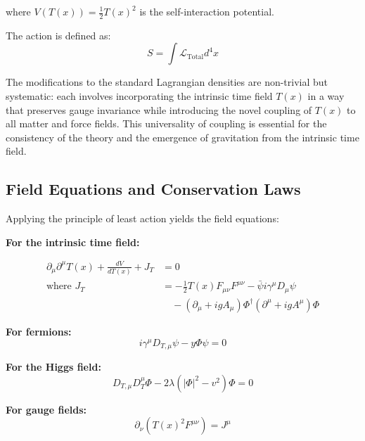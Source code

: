 \documentclass[12pt,a4paper]{article} %
\newcommand{\Tfield}{T(x)}
\newcommand{\DTmu}{D_{T,\mu}}
\newcommand{\calL}{\mathcal{L}}
\begin{document}
	where $V(\Tfield) = \frac{1}{2}\Tfield^2$ is the self-interaction potential.
	
	The action is defined as:
	\begin{equation}
		S = \int\calL_{\text{Total}}d^4x
		\label{eq:action}
	\end{equation}
	
	The modifications to the standard Lagrangian densities are non-trivial but systematic:
	each involves incorporating the intrinsic time field $\Tfield$
	in a way that preserves gauge invariance
	while introducing the novel coupling of $\Tfield$ to all matter and force fields. 
	This universality of coupling is essential for the consistency of the theory
	and the emergence of gravitation from the intrinsic time field.
	
	\subsection{Field Equations and Conservation Laws}
	\label{subsec:field_eqs}
	
	Applying the principle of least action yields the field equations:
	
	\textbf{For the intrinsic time field:}
	\begin{tcolorbox}[width=\textwidth, colback=white, colframe=black, boxrule=0.5pt]
		\begin{align}
			\partial_{\mu}\partial^{\mu}\Tfield + \frac{dV}{d\Tfield} + J_T &= 0
			\label{eq:intrinsic_field_eq_part1} \\
			\text{where } J_T &= -\frac{1}{2}\Tfield F_{\mu\nu}F^{\mu\nu}
			- \bar{\psi}i\gamma^{\mu}D_{\mu}\psi
			\label{eq:intrinsic_source_part1} \\
			&\quad - (\partial_{\mu} + igA_{\mu})\Phi^{\dagger}(\partial^{\mu} + igA^{\mu})\Phi
			\label{eq:intrinsic_source_part2}
		\end{align}
	\end{tcolorbox}
	
	\textbf{For fermions:}
	\begin{equation}
		i\gamma^{\mu}\DTmu\psi - y\Phi\psi = 0
		\label{eq:fermion_field_eq}
	\end{equation}
	
	\textbf{For the Higgs field:}
	\begin{equation}
		D_{T,\mu}D_T^{\mu}\Phi - 2\lambda(|\Phi|^2 - v^2)\Phi = 0
		\label{eq:higgs_field_eq}
	\end{equation}
	
	\textbf{For gauge fields:}
	\begin{equation}
		\partial_{\nu}(\Tfield^2 F^{\mu\nu}) = J^{\mu}
		\label{eq:gauge_field_eq}
	\end{equation}
	
\end{document}
